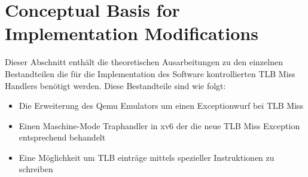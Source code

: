 \section{Conceptual Basis for Implementation Modifications}
Dieser Abschnitt enthält die theoretischen Ausarbeitungen zu den einzelnen Bestandteilen die für
die Implementation des Software kontrollierten TLB Miss Handlers benötigt werden. Diese Bestandteile
sind wie folgt:
\begin{itemize}
    \item Die Erweiterung des Qemu Emulators um einen Exceptionwurf bei TLB Miss
    \item Einen Maschine-Mode Traphandler in xv6 der die neue TLB Miss Exception entsprechend behandelt
    \item Eine Möglichkeit um TLB einträge mittels spezieller Instruktionen zu schreiben
\end{itemize}













